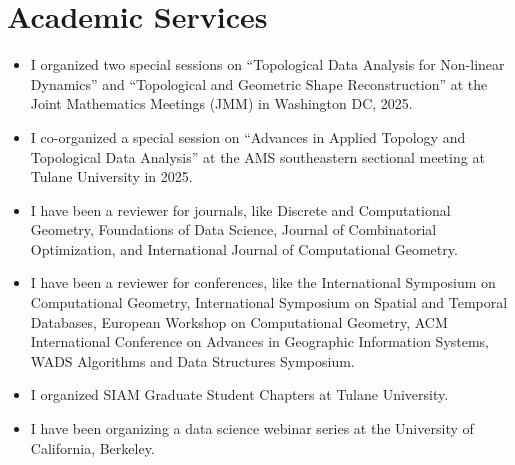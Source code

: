 \documentclass[11pt]{article}
\newif\iflong
\begin{document}

\iflong


\fi


\section{Academic Services}
\begin{itemize}[leftmargin=*]
\item I organized two special sessions on ``Topological Data Analysis for Non-linear Dynamics'' and ``Topological and Geometric Shape Reconstruction'' at the Joint Mathematics Meetings (JMM) in Washington DC, 2025. 

\item I co-organized a special session on ``Advances in Applied Topology and Topological Data Analysis'' at the AMS southeastern sectional meeting at Tulane University in 2025. 

\item I have been a reviewer for journals, like Discrete and Computational Geometry, Foundations of Data Science, Journal of Combinatorial Optimization, and International Journal of Computational Geometry.
\item I have been a reviewer for conferences, like the International Symposium on
Computational Geometry, International Symposium on Spatial and Temporal
Databases, European Workshop on Computational Geometry, ACM International
Conference on Advances in Geographic Information Systems, WADS Algorithms and
Data Structures Symposium.
\item I organized SIAM Graduate Student Chapters at Tulane University. 
\item I have been organizing a data science webinar series at the University of
California, Berkeley. 
\end{itemize}

\iflong
\section{Computational Skills}
Java, C, R, Python, Ruby, JavaScript, SQL, Bash. \\
\fi
\end{document}
